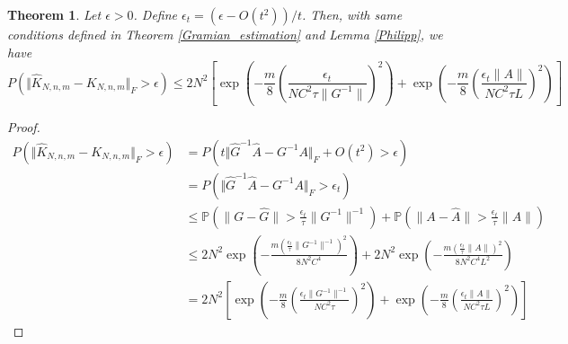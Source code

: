 \documentclass{article}[11]
\newtheorem{theorem}{Theorem}
\begin{document}
	\begin{theorem}
		Let $\epsilon>0$. Define $\epsilon_t = \left(\epsilon - O(t^2)\right)/t$. Then, with same conditions defined in Theorem \ref{Gramian_estimation} and Lemma \ref{Philipp}, we have
		\begin{equation*}
			P\left(\Vert \widehat{K}_{N,n,m} - K_{N,n,m} \Vert_F > \epsilon \right) \leq 2N^2 \left[ \exp \left( -\frac{m}{8} \left(\frac{\epsilon_t}{N C^2 \tau \|G^{-1}\|}\right)^2 \right) + \exp \left( -\frac{m}{8} \left(\frac{\epsilon_t \|A\|}{N C^2 \tau L}\right)^2 \right) \right]
		\end{equation*}  
	\end{theorem}
	\begin{proof}
		\begin{align*}
			P\left(\Vert \widehat{K}_{N,n,m} - K_{N,n,m} \Vert_F > \epsilon \right) 
			&= P\left( t\Vert \widehat{G}^{-1} \widehat{A} - G^{-1}A \Vert_F + O(t^2) > \epsilon \right) \\
			&= P\left( \Vert \widehat{G}^{-1} \widehat{A} - G^{-1}A \Vert_F  > \epsilon_t \right) \\
			&\leq \mathbb{P}\left(\|G - \widehat{G}\| > \frac{\epsilon_t}{\tau} \|G^{-1}\|^{-1} \right) + \mathbb{P}\left(\|A - \widehat{A}\| > \frac{\epsilon_t}{\tau} \|A\| \right) \\
			&\leq 2N^2 \exp \left( -\frac{m (\frac{\epsilon_t}{\tau} \|G^{-1}\|^{-1})^2}{8 N^2 C^4} \right) + 2N^2 \exp \left( -\frac{m (\frac{\epsilon_t}{\tau} \|A\|)^2}{8 N^2 C^4 L^2} \right) \\
			&= 2N^2 \left[ \exp \left( -\frac{m}{8} \left(\frac{\epsilon_t \|G^{-1}\|^{-1}}{N C^2 \tau}\right)^2 \right) + \exp \left( -\frac{m}{8} \left(\frac{\epsilon_t \|A\|}{N C^2 \tau L}\right)^2 \right) \right]
		\end{align*}  
	\end{proof}
	
	
	
\end{document}
